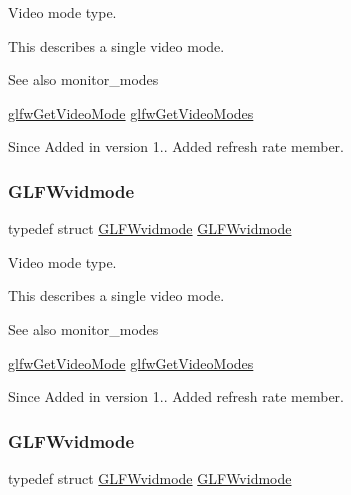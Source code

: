 Video mode type. 

This describes a single video mode.

\begin{DoxySeeAlso}{See also}
monitor\+\_\+modes 

\hyperlink{group__monitor_ga21f7f60de4f4d0fa360c7ad159b75c9e}{glfw\+Get\+Video\+Mode} \hyperlink{group__monitor_ga7eaea6132f15e9b5d47eb94f88547f79}{glfw\+Get\+Video\+Modes}
\end{DoxySeeAlso}
\begin{DoxySince}{Since}
Added in version 1..  Added refresh rate member. 
\end{DoxySince}
\mbox{\label{group__monitor_gae48aadf4ea0967e6605c8f58fa5daccb}} 
\subsubsection{\texorpdfstring{G\+L\+F\+Wvidmode}{GLFWvidmode}\hspace{0.1cm}{\footnotesize\ttfamily [4/5]}}
{\footnotesize\ttfamily typedef struct \hyperlink{structGLFWvidmode}{G\+L\+F\+Wvidmode}  \hyperlink{structGLFWvidmode}{G\+L\+F\+Wvidmode}}



Video mode type. 

This describes a single video mode.

\begin{DoxySeeAlso}{See also}
monitor\+\_\+modes 

\hyperlink{group__monitor_ga21f7f60de4f4d0fa360c7ad159b75c9e}{glfw\+Get\+Video\+Mode} \hyperlink{group__monitor_ga7eaea6132f15e9b5d47eb94f88547f79}{glfw\+Get\+Video\+Modes}
\end{DoxySeeAlso}
\begin{DoxySince}{Since}
Added in version 1..  Added refresh rate member. 
\end{DoxySince}
\mbox{\label{group__monitor_gae48aadf4ea0967e6605c8f58fa5daccb}} 
\subsubsection{\texorpdfstring{G\+L\+F\+Wvidmode}{GLFWvidmode}\hspace{0.1cm}{\footnotesize\ttfamily [5/5]}}
{\footnotesize\ttfamily typedef struct \hyperlink{structGLFWvidmode}{G\+L\+F\+Wvidmode}  \hyperlink{structGLFWvidmode}{G\+L\+F\+Wvidmode}}




